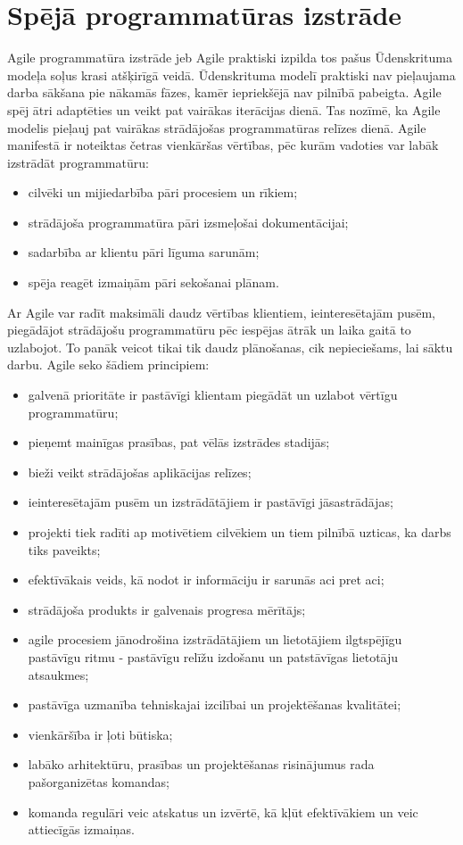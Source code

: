 \section{Spējā programmatūras izstrāde}
Agile programmatūra izstrāde jeb Agile  praktiski izpilda tos pašus Ūdenskrituma modeļa soļus krasi atšķirīgā veidā. Ūdenskrituma modelī praktiski nav pieļaujama darba sākšana pie nākamās fāzes, kamēr iepriekšējā nav pilnībā pabeigta. Agile spēj ātri adaptēties un veikt pat vairākas iterācijas dienā. Tas nozīmē, ka Agile modelis pieļauj pat vairākas strādājošas programmatūras relīzes dienā.
Agile manifestā ir noteiktas četras vienkāršas vērtības, pēc kurām vadoties var labāk izstrādāt programmatūru:
\begin{itemize}
	\item cilvēki un mijiedarbība pāri procesiem un rīkiem;
	\item strādājoša programmatūra pāri izsmeļošai dokumentācijai;
	\item sadarbība ar klientu pāri līguma sarunām;
	\item spēja reagēt izmaiņām pāri sekošanai plānam.
\end{itemize}
Ar Agile var radīt maksimāli daudz vērtības klientiem, ieinteresētajām pusēm, piegādājot strādājošu programmatūru pēc iespējas ātrāk un laika gaitā to uzlabojot. To panāk veicot tikai tik daudz plānošanas, cik nepieciešams, lai sāktu darbu.
Agile seko šādiem principiem:
\begin{itemize}
	\item galvenā prioritāte ir pastāvīgi klientam piegādāt un uzlabot vērtīgu programmatūru;
	\item pieņemt mainīgas prasības, pat vēlās izstrādes stadijās;
	\item bieži veikt strādājošas aplikācijas relīzes;
	\item ieinteresētajām pusēm un izstrādātājiem ir pastāvīgi jāsastrādājas;
	\item projekti tiek radīti ap motivētiem cilvēkiem un tiem pilnībā uzticas, ka darbs tiks paveikts;
	\item efektīvākais veids, kā nodot ir informāciju ir sarunās aci pret aci;
	\item strādājoša produkts ir galvenais progresa mērītājs;
	\item agile procesiem jānodrošina izstrādātājiem un lietotājiem ilgtspējīgu pastāvīgu ritmu - pastāvīgu relīžu izdošanu un patstāvīgas lietotāju atsaukmes;
	\item pastāvīga uzmanība tehniskajai izcilībai un projektēšanas kvalitātei;
	\item vienkāršība ir ļoti būtiska;
	\item labāko arhitektūru, prasības un projektēšanas risinājumus rada pašorganizētas komandas;
	\item komanda regulāri veic atskatus un izvērtē, kā kļūt efektīvākiem un veic attiecīgās izmaiņas.
\end{itemize}
